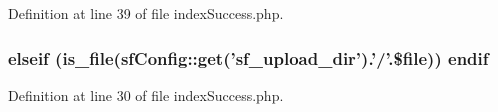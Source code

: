 Definition at line 39 of file index\-Success.\-php.

\hypertarget{backend_2modules_2upload_2templates_2index_success_8php_adc32cd369c6cac488622fdb39154192b}{
\subsubsection[{endif}]{\setlength{\rightskip}{0pt plus 5cm}elseif (is\-\_\-file(sf\-Config\-::get('sf\-\_\-upload\-\_\-dir').'/'.\$file)) endif}}\label{backend_2modules_2upload_2templates_2index_success_8php_adc32cd369c6cac488622fdb39154192b}


Definition at line 30 of file index\-Success.\-php.

